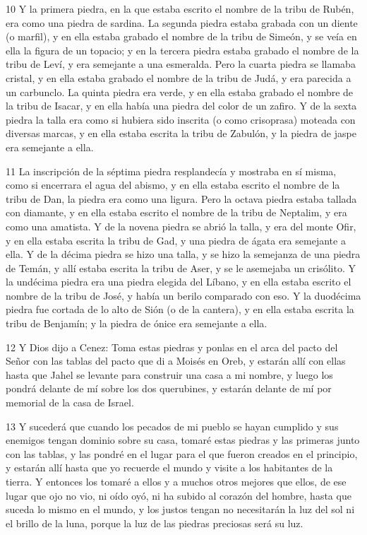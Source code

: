 \par 10 Y la primera piedra, en la que estaba escrito el nombre de la tribu de Rubén, era como una piedra de sardina. La segunda piedra estaba grabada con un diente (o marfil), y en ella estaba grabado el nombre de la tribu de Simeón, y se veía en ella la figura de un topacio; y en la tercera piedra estaba grabado el nombre de la tribu de Leví, y era semejante a una esmeralda. Pero la cuarta piedra se llamaba cristal, y en ella estaba grabado el nombre de la tribu de Judá, y era parecida a un carbunclo. La quinta piedra era verde, y en ella estaba grabado el nombre de la tribu de Isacar, y en ella había una piedra del color de un zafiro. Y de la sexta piedra la talla era como si hubiera sido inscrita (o como crisoprasa) moteada con diversas marcas, y en ella estaba escrita la tribu de Zabulón, y la piedra de jaspe era semejante a ella.

\par 11 La inscripción de la séptima piedra resplandecía y mostraba en sí misma, como si encerrara el agua del abismo, y en ella estaba escrito el nombre de la tribu de Dan, la piedra era como una ligura. Pero la octava piedra estaba tallada con diamante, y en ella estaba escrito el nombre de la tribu de Neptalim, y era como una amatista. Y de la novena piedra se abrió la talla, y era del monte Ofir, y en ella estaba escrita la tribu de Gad, y una piedra de ágata era semejante a ella. Y de la décima piedra se hizo una talla, y se hizo la semejanza de una piedra de Temán, y allí estaba escrita la tribu de Aser, y se le asemejaba un crisólito. Y la undécima piedra era una piedra elegida del Líbano, y en ella estaba escrito el nombre de la tribu de José, y había un berilo comparado con eso. Y la duodécima piedra fue cortada de lo alto de Sión (o de la cantera), y en ella estaba escrita la tribu de Benjamín; y la piedra de ónice era semejante a ella.

\par 12 Y Dios dijo a Cenez: Toma estas piedras y ponlas en el arca del pacto del Señor con las tablas del pacto que di a Moisés en Oreb, y estarán allí con ellas hasta que Jahel se levante para construir una casa a mi nombre, y luego los pondrá delante de mí sobre los dos querubines, y estarán delante de mí por memorial de la casa de Israel.

\par 13 Y sucederá que cuando los pecados de mi pueblo se hayan cumplido y sus enemigos tengan dominio sobre su casa, tomaré estas piedras y las primeras junto con las tablas, y las pondré en el lugar para el que fueron creados en el principio, y estarán allí hasta que yo recuerde el mundo y visite a los habitantes de la tierra. Y entonces los tomaré a ellos y a muchos otros mejores que ellos, de ese lugar que ojo no vio, ni oído oyó, ni ha subido al corazón del hombre, hasta que suceda lo mismo en el mundo, y los justos tengan no necesitarán la luz del sol ni el brillo de la luna, porque la luz de las piedras preciosas será su luz.

